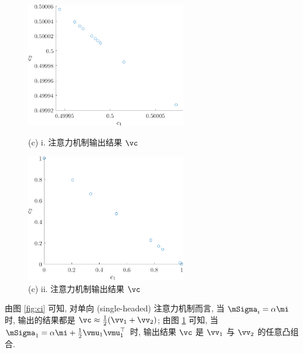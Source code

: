 \documentclass[openany]{ctexbook}
\theoremstyle{kaiti}
\theoremstyle{normal}
\begin{document}
\begin{figure}[htbp]
  \centering
  \begin{minipage}[t]{0.48\textwidth}
    \centering
    \includegraphics[width=7cm]{ci.pdf}
    \caption{(c) i. 注意力机制输出结果 $\vc$}
    \label{fig:ci}
  \end{minipage}
  \begin{minipage}[t]{0.48\textwidth}
    \centering
    \includegraphics[width=7cm]{cii.pdf}
    \caption{(c) ii. 注意力机制输出结果 $\vc$}
    \label{fig:cii}
  \end{minipage}
\end{figure}

由图 \ref{fig:ci} 可知, 对单向 (single-headed) 注意力机制而言, 当 $\mSigma_{i}=\alpha \mi$ 时, 输出的结果都是 $\vc\approx\frac{1}{2}(\vv_{1}+\vv_{2})$; 由图 \ref{fig:cii} 可知, 当 $\mSigma_{1}=\alpha \mi+\frac{1}{2}\vmu_{1} \vmu_{1}^{\top}$ 时, 输出结果 $\vc$ 是 $\vv_1$ 与 $\vv_2$ 的任意凸组合.
\end{document}
